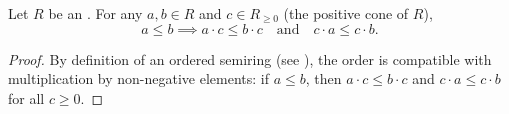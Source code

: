 \begin{proposition} \label{proposition:multiplication_by_positive_preserves_order_in_ordered_semiring}
    Let $R$ be an . For any $a,b \in R$ and $c \in R_{\ge 0}$ (the positive cone of $R$),
    $$a \le b \implies a \cdot c \le b \cdot c \quad\text{and}\quad c \cdot a \le c \cdot b.$$
\end{proposition}
\begin{proof}
    By definition of an ordered semiring (see ), the order is compatible with multiplication by non-negative elements: if $a \le b$, then $a \cdot c \le b \cdot c$ and $c \cdot a \le c \cdot b$ for all $c \ge 0$.
\end{proof}